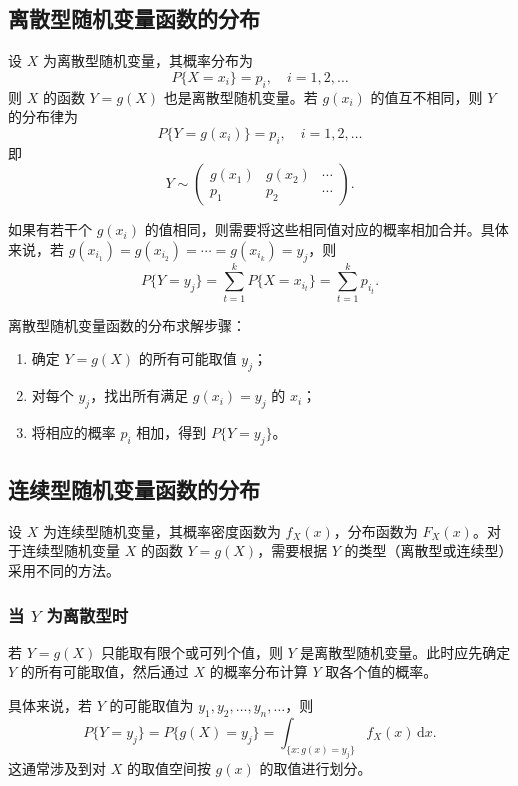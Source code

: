 \documentclass[lang=cn,11pt]{elegantbook}
\begin{document}
\subsection{离散型随机变量函数的分布} \label{subsec:discrete-to-discrete}

设 $X$ 为离散型随机变量，其概率分布为
\[
P\{X = x_i\} = p_i,\quad i=1,2,\dots
\]
则 $X$ 的函数 $Y = g(X)$ 也是离散型随机变量。若 $g(x_i)$ 的值互不相同，则 $Y$ 的分布律为
\[
P\{Y = g(x_i)\} = p_i,\quad i=1,2,\dots
\]
即
\[
Y \sim \begin{pmatrix} g(x_1) & g(x_2) & \cdots \\ p_1 & p_2 & \cdots \end{pmatrix}.
\]

如果有若干个 $g(x_i)$ 的值相同，则需要将这些相同值对应的概率相加合并。具体来说，若 $g(x_{i_1}) = g(x_{i_2}) = \cdots = g(x_{i_k}) = y_j$，则
\[
P\{Y = y_j\} = \sum_{t=1}^{k} P\{X = x_{i_t}\} = \sum_{t=1}^{k} p_{i_t}.
\]

\begin{property}\label{prop:discrete-function}
离散型随机变量函数的分布求解步骤：
\begin{enumerate}
    \item 确定 $Y = g(X)$ 的所有可能取值 $y_j$；
    \item 对每个 $y_j$，找出所有满足 $g(x_i) = y_j$ 的 $x_i$；
    \item 将相应的概率 $p_i$ 相加，得到 $P\{Y = y_j\}$。
\end{enumerate}
\end{property}

\subsection{连续型随机变量函数的分布} \label{subsec:continuous-function}

设 $X$ 为连续型随机变量，其概率密度函数为 $f_X(x)$，分布函数为 $F_X(x)$。对于连续型随机变量 $X$ 的函数 $Y = g(X)$，需要根据 $Y$ 的类型（离散型或连续型）采用不同的方法。

\subsubsection{当 $Y$ 为离散型时}

若 $Y = g(X)$ 只能取有限个或可列个值，则 $Y$ 是离散型随机变量。此时应先确定 $Y$ 的所有可能取值，然后通过 $X$ 的概率分布计算 $Y$ 取各个值的概率。

具体来说，若 $Y$ 的可能取值为 $y_1, y_2, \dots, y_n, \dots$，则
\[
P\{Y = y_j\} = P\{g(X) = y_j\} = \int_{\{x: g(x) = y_j\}} f_X(x) \,\mathrm{d}x.
\]
这通常涉及到对 $X$ 的取值空间按 $g(x)$ 的取值进行划分。
\end{document}
